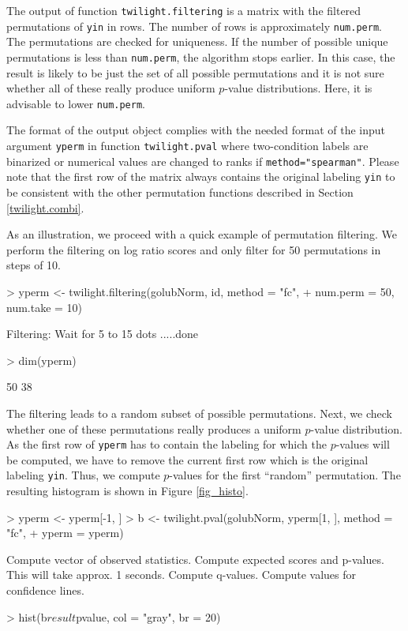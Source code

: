 \documentclass[11pt,a4paper,fleqn]{report}
\newcommand{\Rfunction}[1]{{\texttt{#1}}}
\newcommand{\Rfunarg}[1]{{\texttt{#1}}}
\begin{document}
The output of function \Rfunction{twilight.filtering} is a matrix with the filtered permutations of \Rfunarg{yin} in rows. The number of rows is approximately \Rfunarg{num.perm}. The permutations are checked for uniqueness. If the number of possible unique permutations is less than \Rfunarg{num.perm}, the algorithm stops earlier. In this case, the result is likely to be just the set of all possible permutations and it is not sure whether all of these really produce uniform $p$-value distributions. Here, it is advisable to lower \Rfunarg{num.perm}.

The format of the output object complies with the needed format of the input argument \Rfunarg{yperm} in function \Rfunction{twilight.pval} where two-condition labels are binarized or numerical values are changed to ranks if \Rfunarg{method="spearman"}. Please note that the first row of the matrix always contains the original labeling \Rfunarg{yin} to be consistent with the other permutation functions described in Section \ref{twilight.combi}.
       
As an illustration, we proceed with a quick example of permutation filtering. We perform the filtering on log ratio scores and only filter for 50 permutations in steps of 10.

\begin{Schunk}
\begin{Sinput}
> yperm <- twilight.filtering(golubNorm, id, method = "fc", 
+     num.perm = 50, num.take = 10)
\end{Sinput}
\begin{Soutput}
Filtering: Wait for 5 to 15 dots .....done
\end{Soutput}
\begin{Sinput}
> dim(yperm)
\end{Sinput}
\begin{Soutput}
[1] 50 38
\end{Soutput}
\end{Schunk}

The filtering leads to a random subset of possible permutations. Next, we check whether one of these permutations really produces a uniform $p$-value distribution. As the first row of \Rfunarg{yperm} has to contain the labeling for which the $p$-values will be computed, we have to remove the current first row which is the original labeling \Rfunarg{yin}. Thus, we compute $p$-values for the first ``random'' permutation. The resulting histogram is shown in Figure \ref{fig_histo}.

\begin{Schunk}
\begin{Sinput}
> yperm <- yperm[-1, ]
> b <- twilight.pval(golubNorm, yperm[1, ], method = "fc", 
+     yperm = yperm)
\end{Sinput}
\begin{Soutput}
Compute vector of observed statistics. 
Compute expected scores and p-values. This will take approx. 1 seconds. 
Compute q-values. 
Compute values for confidence lines. 
\end{Soutput}
\begin{Sinput}
> hist(b$result$pvalue, col = "gray", br = 20)
\end{Sinput}
\end{Schunk}
\end{document}

